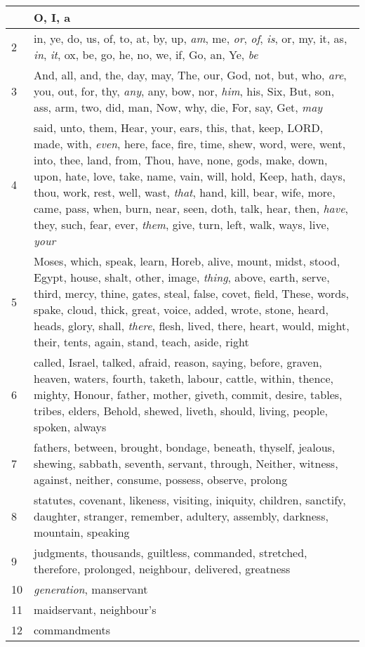 \begin{longtable}{l|p{3.75in}}
\hline \hline
\endlastfoot
1 & O, I, a \\ \hline
2 & in, ye, do, us, of, to, at, by, up, \emph{am}, me, \emph{or}, \emph{of}, \emph{is}, or, my, it, as, \emph{in}, \emph{it}, ox, be, go, he, no, we, if, Go, an, Ye, \emph{be} \\ \hline
3 & And, all, and, the, day, may, The, our, God, not, but, who, \emph{are}, you, out, for, thy, \emph{any}, any, bow, nor, \emph{him}, his, Six, But, son, ass, arm, two, did, man, Now, why, die, For, say, Get, \emph{may} \\ \hline
4 & said, unto, them, Hear, your, ears, this, that, keep, LORD, made, with, \emph{even}, here, face, fire, time, shew, word, were, went, into, thee, land, from, Thou, have, none, gods, make, down, upon, hate, love, take, name, vain, will, hold, Keep, hath, days, thou, work, rest, well, wast, \emph{that}, hand, kill, bear, wife, more, came, pass, when, burn, near, seen, doth, talk, hear, then, \emph{have}, they, such, fear, ever, \emph{them}, give, turn, left, walk, ways, live, \emph{your} \\ \hline
5 & Moses, which, speak, learn, Horeb, alive, mount, midst, stood, Egypt, house, shalt, other, image, \emph{thing}, above, earth, serve, third, mercy, thine, gates, steal, false, covet, field, These, words, spake, cloud, thick, great, voice, added, wrote, stone, heard, heads, glory, shall, \emph{there}, flesh, lived, there, heart, would, might, their, tents, again, stand, teach, aside, right \\ \hline
6 & called, Israel, talked, afraid, reason, saying, before, graven, heaven, waters, fourth, taketh, labour, cattle, within, thence, mighty, Honour, father, mother, giveth, commit, desire, tables, tribes, elders, Behold, shewed, liveth, should, living, people, spoken, always \\ \hline
7 & fathers, between, brought, bondage, beneath, thyself, jealous, shewing, sabbath, seventh, servant, through, Neither, witness, against, neither, consume, possess, observe, prolong \\ \hline
8 & statutes, covenant, likeness, visiting, iniquity, children, sanctify, daughter, stranger, remember, adultery, assembly, darkness, mountain, speaking \\ \hline
9 & judgments, thousands, guiltless, commanded, stretched, therefore, prolonged, neighbour, delivered, greatness \\ \hline
10 & \emph{generation}, manservant \\ \hline
11 & maidservant, neighbour's \\ \hline
12 & commandments \\ \hline
\end{longtable}






